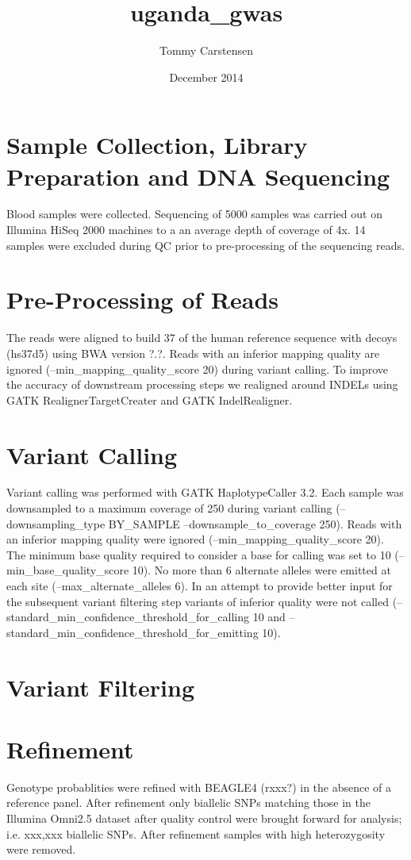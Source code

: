 \documentclass{article}
\title{uganda\_gwas}
\author{Tommy Carstensen}
\date{December 2014}
\begin{document}
\maketitle

\section{Sample Collection, Library Preparation and DNA Sequencing}
Blood samples were collected. Sequencing of 5000 samples was carried out on Illumina HiSeq 2000 machines to a an average depth of coverage of 4x. 14 samples were excluded during QC prior to pre-processing of the sequencing reads.

\section{Pre-Processing of Reads}
The reads were aligned to build 37 of the human reference sequence with decoys (hs37d5) using BWA version ?.?. Reads with an inferior mapping quality are ignored (--min_mapping_quality_score 20) during variant calling. To improve the accuracy of downstream processing steps we realigned around INDELs using GATK RealignerTargetCreater and GATK IndelRealigner.

\section{Variant Calling}
Variant calling was performed with GATK HaplotypeCaller 3.2. Each sample was downsampled to a maximum coverage of 250 during variant calling (--downsampling_type BY_SAMPLE --downsample_to_coverage 250). Reads with an inferior mapping quality were ignored (--min_mapping_quality_score 20). The minimum base quality required to consider a base for calling was set to 10 (--min_base_quality_score 10). No more than 6 alternate alleles were emitted at each site (--max_alternate_alleles 6). In an attempt to provide better input for the subsequent variant filtering step variants of inferior quality were not called  (--standard_min_confidence_threshold_for_calling 10 and --standard_min_confidence_threshold_for_emitting 10).

\section{Variant Filtering}

\section{Refinement}
Genotype probablities were refined with BEAGLE4 (rxxx?) in the absence of a reference panel. After refinement only biallelic SNPs matching those in the Illumina Omni2.5 dataset after quality control were brought forward for analysis; i.e. xxx,xxx biallelic SNPs. After refinement samples with high heterozygosity were removed.
\end{document}
